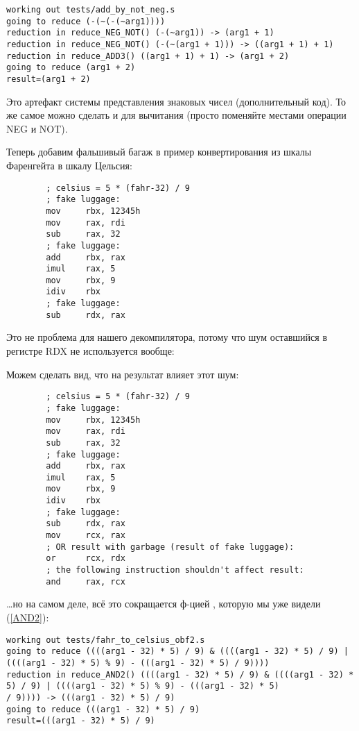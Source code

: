 \begin{lstlisting}
working out tests/add_by_not_neg.s
going to reduce (-(~(-(~arg1))))
reduction in reduce_NEG_NOT() (-(~arg1)) -> (arg1 + 1)
reduction in reduce_NEG_NOT() (-(~(arg1 + 1))) -> ((arg1 + 1) + 1)
reduction in reduce_ADD3() ((arg1 + 1) + 1) -> (arg1 + 2)
going to reduce (arg1 + 2)
result=(arg1 + 2)
\end{lstlisting}

Это артефакт системы представления знаковых чисел (дополнительный код).
То же самое можно сделать и для вычитания (просто поменяйте местами операции NEG и NOT).

Теперь добавим фальшивый багаж в пример конвертирования из шкалы Фаренгейта в шкалу Цельсия:

\begin{lstlisting}
        ; celsius = 5 * (fahr-32) / 9
        ; fake luggage:
        mov     rbx, 12345h
        mov     rax, rdi
        sub     rax, 32
        ; fake luggage:
        add     rbx, rax
        imul    rax, 5
        mov     rbx, 9
        idiv    rbx
        ; fake luggage:
        sub     rdx, rax
\end{lstlisting}

Это не проблема для нашего декомпилятора, потому что шум оставшийся в регистре RDX не используется вообще:



Можем сделать вид, что на результат влияет этот шум:

\begin{lstlisting}
        ; celsius = 5 * (fahr-32) / 9
        ; fake luggage:
        mov     rbx, 12345h
        mov     rax, rdi
        sub     rax, 32
        ; fake luggage:
        add     rbx, rax
        imul    rax, 5
        mov     rbx, 9
        idiv    rbx
        ; fake luggage:
        sub     rdx, rax
        mov     rcx, rax
        ; OR result with garbage (result of fake luggage):
        or      rcx, rdx
        ; the following instruction shouldn't affect result:
        and     rax, rcx
\end{lstlisting}

\dots но на самом деле, всё это сокращается ф-цией , которую мы уже видели (\ref{AND2}):

\begin{lstlisting}
working out tests/fahr_to_celsius_obf2.s
going to reduce ((((arg1 - 32) * 5) / 9) & ((((arg1 - 32) * 5) / 9) | ((((arg1 - 32) * 5) % 9) - (((arg1 - 32) * 5) / 9))))
reduction in reduce_AND2() ((((arg1 - 32) * 5) / 9) & ((((arg1 - 32) * 5) / 9) | ((((arg1 - 32) * 5) % 9) - (((arg1 - 32) * 5)
/ 9)))) -> (((arg1 - 32) * 5) / 9)
going to reduce (((arg1 - 32) * 5) / 9)
result=(((arg1 - 32) * 5) / 9)
\end{lstlisting}


